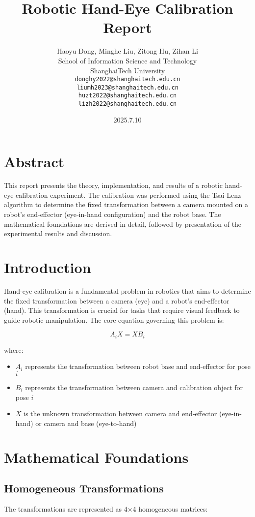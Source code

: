 \documentclass{article}
\title{Robotic Hand-Eye Calibration Report}
\author{Haoyu Dong, Minghe Liu, Zitong Hu, Zihan Li\\
	School of Information Science and Technology\\
	ShanghaiTech University\\
	\texttt{donghy2022@shanghaitech.edu.cn} \\
        \texttt{liumh2023@shanghaitech.edu.cn} \\
	\texttt{huzt2022@shanghaitech.edu.cn} \\
        \texttt{lizh2022@shanghaitech.edu.cn} \\
}
\date{2025.7.10}
\begin{document}
\maketitle

\section{Abstract}
This report presents the theory, implementation, and results of a robotic hand-eye calibration experiment. The calibration was performed using the Tsai-Lenz algorithm to determine the fixed transformation between a camera mounted on a robot's end-effector (eye-in-hand configuration) and the robot base. The mathematical foundations are derived in detail, followed by presentation of the experimental results and discussion.

\section{Introduction}
Hand-eye calibration is a fundamental problem in robotics that aims to determine the fixed transformation between a camera (eye) and a robot's end-effector (hand). This transformation is crucial for tasks that require visual feedback to guide robotic manipulation. The core equation governing this problem is:

\begin{equation}
A_i X = X B_i
\end{equation}

where:
\begin{itemize}
\item $A_i$ represents the transformation between robot base and end-effector for pose $i$
\item $B_i$ represents the transformation between camera and calibration object for pose $i$
\item $X$ is the unknown transformation between camera and end-effector (eye-in-hand) or camera and base (eye-to-hand)
\end{itemize}

\section{Mathematical Foundations}

\subsection{Homogeneous Transformations}
The transformations are represented as 4×4 homogeneous matrices:
\end{document}
